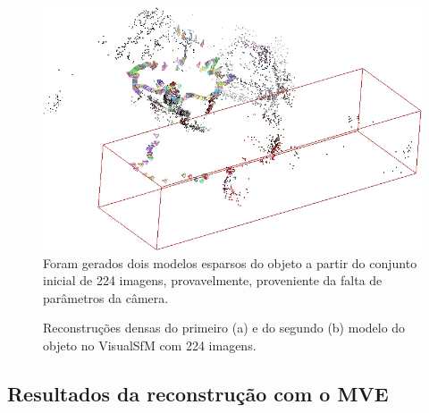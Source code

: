 \begin{figure}[!h]
	\centering
	\includegraphics[width=0.5\linewidth]{figs/perto_longe_esparsa_2.jpg}
	\caption{%
	Foram gerados dois modelos esparsos do objeto a partir do conjunto inicial de 224 imagens, provavelmente, proveniente da falta de parâmetros da câmera.
	}\label{fig:reconstrucaoEsparsaVisualSFM224:2}
\end{figure}

\begin{figure}[!h]
	\centering
	\caption{Reconstruções densas do primeiro (a) e do segundo (b) modelo do objeto no VisualSfM com 224 imagens.
	}
\end{figure}


\subsection{Resultados da reconstrução com o MVE}

